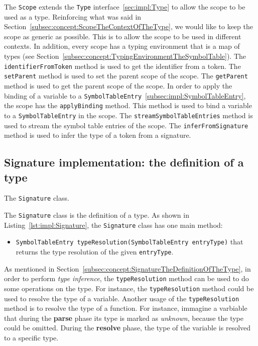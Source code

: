 The \texttt{Scope} extends the \texttt{Type} interface~\ref{sec:impl:Type} to allow the scope to be used as a type. Reinforcing what was said in Section~\ref{subsec:concept:ScopeTheContextOfTheType}, we would like to keep the scope as generic as possible. This is to allow the scope to be used in different contexts. In addition, every scope has a typing environment that is a map of types (see Section~\ref{subsec:concept:TypingEnvironmentTheSymbolTable}). The \texttt{identifierFromToken} method is used to get the identifier from a token. The \texttt{setParent} method is used to set the parent scope of the scope. The \texttt{getParent} method is used to get the parent scope of the scope.
In order to apply the binding of a variable to a \texttt{SymbolTableEntry}~\ref{subsec:impl:SymbolTableEntry}, the scope has the \texttt{applyBinding} method. This method is used to bind a variable to a \texttt{SymbolTableEntry} in the scope. The \texttt{streamSymbolTableEntries} method is used to stream the symbol table entries of the scope. The \texttt{inferFromSignature} method is used to infer the type of a token from a signature.

\subsection{Signature implementation: the definition of a type}\label{subsec:impl:Signature}

\begin{Listing}[tb]
    \centering
    \caption{The \texttt{Signature} class.}
    \label{lst:impl:Signature}
\end{Listing}

The \texttt{Signature} class is the definition of a type. As shown in Listing~\ref{lst:impl:Signature}, the \texttt{Signature} class has one main method:
\begin{itemize}
    \item \texttt{SymbolTableEntry typeResolution(SymbolTableEntry entryType)} that returns the type resolution of the given \texttt{entryType}.
\end{itemize}

As mentioned in Section~\ref{subsec:concept:SignatureTheDefinitionOfTheType}, in order to perform \textit{type inference}, the \texttt{typeResolution} method can be used to do some operations on the type. For instance, the \texttt{typeResolution} method could be used to resolve the type of a variable. Another usage of the \texttt{typeResolution} method is to resolve the type of a function. For instance, immagine a varbiable that during the \textbf{parse} phase its type is marked as \textit{unknown}, because the type could be omitted. During the \textbf{resolve} phase, the type of the variable is resolved to a specific type.

